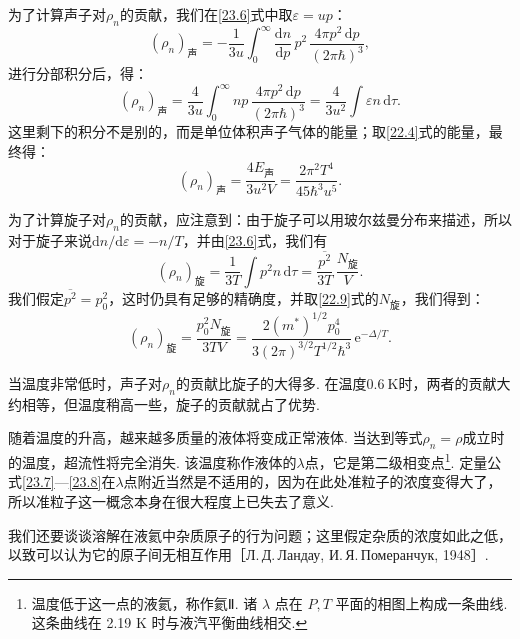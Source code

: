 为了计算声子对$\rho_{n}$的贡献，我们在\eqref{23.6}式中取$\varepsilon=up$：
\begin{equation*}
(\rho_{n})_{\text{声}}=-\frac{1}{3u}\int_{0}^{\infty}\frac{\mathrm{d}n}{\mathrm{d}p}\,p^{2}\,\frac{4\pi p^{2}\,\mathrm{d}p}{(2\pi\hbar)^{3}},
\end{equation*}
进行分部积分后，得：
\begin{equation*}
(\rho_{n})_{\text{声}}=\frac{4}{3u}\int_{0}^{\infty}np\,\frac{4\pi p^{2}\,\mathrm{d}p}{(2\pi\hbar)^{3}}
=\frac{4}{3u^{2}}\int\varepsilon n\,\mathrm{d}\tau.
\end{equation*}
这里剩下的积分不是别的，而是单位体积声子气体的能量；取\eqref{22.4}式的能量，最终得：
\begin{equation}
(\rho_{n})_{\text{声}}=\frac{4E_{\text{声}}}{3u^{2}V}=\frac{2\pi^{2}T^{4}}{45\hbar^{3}u^{5}}.
\label{23.7}
\end{equation}

为了计算旋子对$\rho_{n}$的贡献，应注意到：由于旋子可以用玻尔兹曼分布来描述，所以对于旋子来说$\mathrm{d}n/\mathrm{d}\varepsilon=-n/T$，并由\eqref{23.6}式，我们有
\begin{equation*}
(\rho_{n})_{\text{旋}}=\frac{1}{3T}\int p^{2}n\,\mathrm{d}\tau=\frac{\overline{p^{2}}}{3T}\,\frac{N_{\text{旋}}}{V}.
\end{equation*}
我们假定$\overline{p^{2}}=p_{0}^{2}$，这时仍具有足够的精确度，并取\eqref{22.9}式的$N_{\text{旋}}$，我们得到：
\begin{equation}
(\rho_{n})_{\text{旋}}=\frac{p_{0}^{2}N_{\text{旋}}}{3TV}
=\frac{2(m^{*})^{1/2}p_{0}^{4}}{3(2\pi)^{3/2}T^{1/2}\hbar^{3}}\,\mathrm{e}^{-\varDelta/T}.
\label{23.8}
\end{equation}

当温度非常低时，声子对$\rho_{n}$的贡献比旋子的大得多. 在温度$0.6\ \mathrm{K}$时，两者的贡献大约相等，但温度稍高一些，旋子的贡献就占了优势.

随着温度的升高，越来越多质量的液体将变成正常液体. 当达到等式$\rho_{n}=\rho$成立时的温度，超流性将完全消失. 该温度称作液体的$\lambda$点，它是第二级相变点\footnote{温度低于这一点的液氦，称作氦Ⅱ. 诸 $\lambda$ 点在 $P,T$ 平面的相图上构成一条曲线. 这条曲线在 2.19 K 时与液汽平衡曲线相交.}. 定量公式\eqref{23.7}—\eqref{23.8}在$\lambda$点附近当然是不适用的，因为在此处准粒子的浓度变得大了，所以准粒子这一概念本身在很大程度上已失去了意义.

我们还要谈谈溶解在液氦中杂质原子的行为问题；这里假定杂质的浓度如此之低，以致可以认为它的原子间无相互作用［Л.\,Д.\,Ландау, И.\,Я.\,Померанчук, 1948］.

